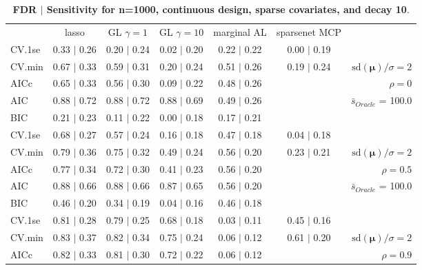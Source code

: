 \begin{table}\vspace{-.5cm}
\caption[l]{ {\it }
{ \bf FDR $\boldsymbol{\mid}$ Sensitivity for n=1000, continuous design, sparse covariates, and  decay  10}.}
\vspace{-.5cm}
\footnotesize{}
\begin{center}
\begin{tabular}{l*{5}{c}|r}
 & lasso & GL $\gamma=1$ & GL $\gamma=10$ & marginal AL & sparsenet MCP  & \\
 \cline{1-7}
CV.1se & 0.33 $\mid$ 0.26 & 0.20 $\mid$ 0.24 & 0.02 $\mid$ 0.20 & 0.22 $\mid$ 0.22 & 0.00 $\mid$ 0.19 & \\
CV.min & 0.67 $\mid$ 0.33 & 0.59 $\mid$ 0.31 & 0.20 $\mid$ 0.24 & 0.51 $\mid$ 0.26 & 0.19 $\mid$ 0.24 &  $\mathrm{sd}(\mathbf{\mu})/\sigma=2$ \\
AICc & 0.65 $\mid$ 0.33 & 0.56 $\mid$ 0.30 & 0.09 $\mid$ 0.22 & 0.48 $\mid$ 0.26 & & $\rho=0$ \\
AIC & 0.88 $\mid$ 0.72 & 0.88 $\mid$ 0.72 & 0.88 $\mid$ 0.69 & 0.49 $\mid$ 0.26 & &  \multirow{2}{*}{$\bar{s}_{Oracle}$ = 100.0} \\
BIC & 0.21 $\mid$ 0.23 & 0.11 $\mid$ 0.22 & 0.00 $\mid$ 0.18 & 0.17 $\mid$ 0.21 & &  \\
 \hline 
CV.1se & 0.68 $\mid$ 0.27 & 0.57 $\mid$ 0.24 & 0.16 $\mid$ 0.18 & 0.47 $\mid$ 0.18 & 0.04 $\mid$ 0.18 & \\
CV.min & 0.79 $\mid$ 0.36 & 0.75 $\mid$ 0.32 & 0.49 $\mid$ 0.24 & 0.56 $\mid$ 0.20 & 0.23 $\mid$ 0.21 &  $\mathrm{sd}(\mathbf{\mu})/\sigma=2$ \\
AICc & 0.77 $\mid$ 0.34 & 0.72 $\mid$ 0.30 & 0.41 $\mid$ 0.23 & 0.56 $\mid$ 0.20 & & $\rho=0.5$ \\
AIC & 0.88 $\mid$ 0.66 & 0.88 $\mid$ 0.66 & 0.87 $\mid$ 0.65 & 0.56 $\mid$ 0.20 & &  \multirow{2}{*}{$\bar{s}_{Oracle}$ = 100.0} \\
BIC & 0.46 $\mid$ 0.20 & 0.34 $\mid$ 0.19 & 0.04 $\mid$ 0.16 & 0.46 $\mid$ 0.18 & &  \\
 \hline 
CV.1se & 0.81 $\mid$ 0.28 & 0.79 $\mid$ 0.25 & 0.68 $\mid$ 0.18 & 0.03 $\mid$ 0.11 & 0.45 $\mid$ 0.16 & \\
CV.min & 0.83 $\mid$ 0.37 & 0.82 $\mid$ 0.34 & 0.75 $\mid$ 0.24 & 0.06 $\mid$ 0.12 & 0.61 $\mid$ 0.20 &  $\mathrm{sd}(\mathbf{\mu})/\sigma=2$ \\
AICc & 0.82 $\mid$ 0.33 & 0.81 $\mid$ 0.30 & 0.72 $\mid$ 0.22 & 0.06 $\mid$ 0.12 & & $\rho=0.9$ \\

\end{tabular}
\end{center}
\end{table}
